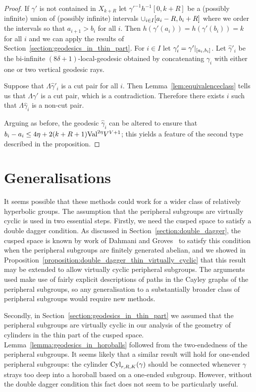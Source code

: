 \begin{proof}
  If $\gamma'$ is not contained in $X_{k+R}$ let $\gamma'^{-1}h^{-1}[0, k+R]$ be a (possibly infinite) union of (possibly infinite) intervals $\cup_{i \in I}[a_i-R, b_i+R]$ where we order the intervals so that $a_{i+1} > b_i$ for all $i$. 
  Then $h(\gamma'(a_i)) = h(\gamma'(b_i)) = k$ for all $i$ and we can apply the results of Section~\ref{section:geodesics_in_thin_part}.  
  For $i \in I$ let $\gamma'_i = \gamma'\vert_{[a_i, b_i]}$. 
  Let $\hat{\gamma}'_i$ be the bi-infinite $(8\delta + 1)$-local-geodesic obtained by concatenating $\gamma_i$ with either one or two vertical geodesic rays.

  Suppose that $\Lambda\hat\gamma'_i$ is a cut pair for all $i$. 
  Then Lemma~\ref{lem:equivalenceclass} tells us that $\Lambda\gamma'$ is a cut pair, which is a contradiction.  
  Therefore there exists $i$ such that $\Lambda\hat\gamma_i$ is a non-cut pair. 

  Arguing as before, the geodesic $\hat\gamma_i$ can be altered to ensure that $b_i - a_i \leq 4\eta + 2(k+R+1)\mathrm{Val}^{2\eta}V^{V+1}$; this yields a feature of the second type described in the proposition.  
\end{proof}

\section{Generalisations}\label{section:cut_pairs_generalisations}

It seems possible that these methods could work for a wider class of relatively hyperbolic groups.
The assumption that the peripheral subgroups are virtually cyclic is used in two essential steps.
Firstly, we need the cusped space to satisfy a double dagger condition.
As discussed in Section~\ref{section:double_dagger}, the cusped space is known by work of Dahmani and Groves~\cite{dahmanigroves08a} to satisfy this condition when the peripheral subgroups are finitely generated abelian, and we showed in Proposition~\ref{proposition:double_dagger_thin_virtually_cyclic} that this result may be extended to allow virtually cyclic peripheral subgroups.
The arguments used make use of fairly explicit descriptions of paths in the Cayley graphs of the peripheral subgroups, so any generalisation to a substantially broader class of peripheral subgroups would require new methods.

Secondly, in Section~\ref{section:geodesics_in_thin_part} we assumed that the peripheral subgroups are virtually cyclic in our analysis of the geometry of cylinders in the thin part of the cusped space.
Lemma~\ref{lemma:geodesics_in_horoballs} followed from the two-endedness of the peripheral subgroups. 
It seems likely that a similar result will hold for one-ended peripheral subgroups: the cylinder $\operatorname{Cyl}_{r, R, K}(\gamma)$ should be connected whenever $\gamma$ strays too deep into a horoball based on a one-ended subgroup.
However, without the double dagger condition this fact does not seem to be particularly useful.

